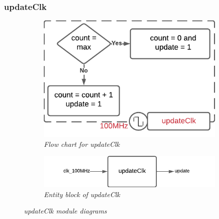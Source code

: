 \documentclass[aps, secnumarabic, balancelastpage, asmath, amssymb, nofootinbib, floatfix,]{revtex4-2}
\begin{document}
{\vspace{-1.5em}
\subsubsection{\fontsize{10pt}{12pt}\selectfont \bf updateClk \label{sec:2.2.2}}
\vspace{-1.5em}

\begin{figure}[h]
\centering
\captionsetup{justification=centering}
\begin{subfigure}{0.5\textwidth}

  \includegraphics[scale = 0.6]{update.pdf}
  \caption{\em Flow chart for updateClk}

\label{fig:subim1}
\end{subfigure}
\begin{subfigure}{0.4\textwidth}
  \includegraphics[scale = 0.72]{update_block.pdf}
  \caption{\em Entity block of updateClk}
  
\label{fig:subim2}
\end{subfigure}
\caption{\em updateClk module diagrams}
\label{fig:5}
\end{figure}

}
\end{document}
